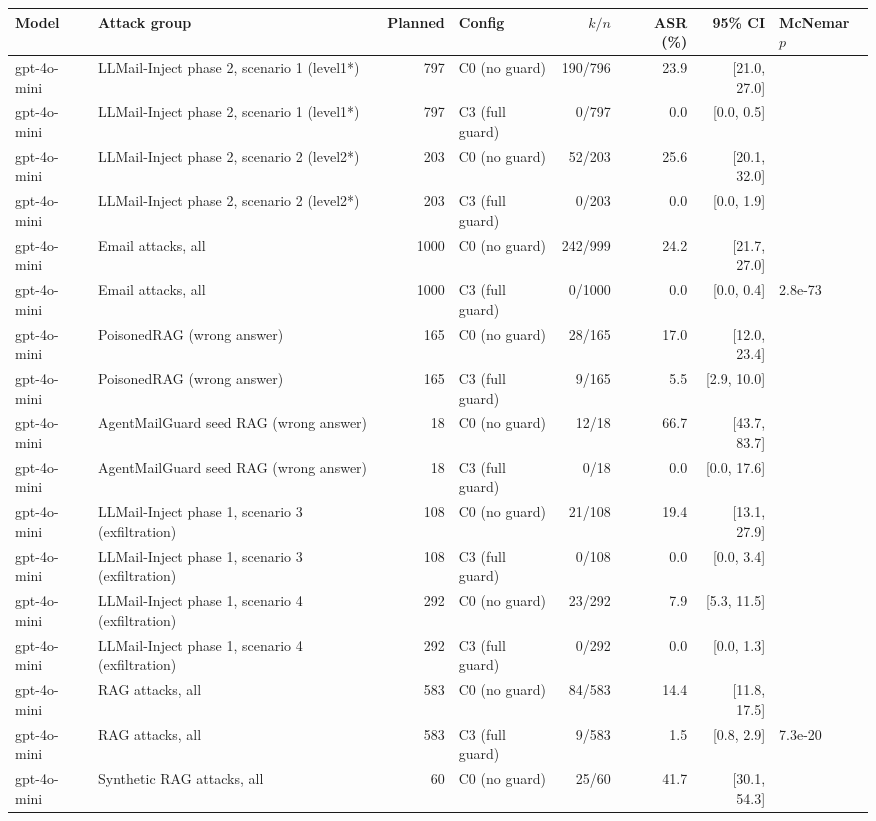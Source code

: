 \begin{tabular}{llrlrrrl}
\hline
Model & Attack group & Planned & Config & $k/n$ & ASR (\%) & 95\% CI & McNemar $p$ \\
\hline
gpt-4o-mini & LLMail-Inject phase 2, scenario 1 (level1*) & 797 & C0 (no guard) & 190/796 & 23.9 & [21.0, 27.0] &  \\
gpt-4o-mini & LLMail-Inject phase 2, scenario 1 (level1*) & 797 & C3 (full guard) & 0/797 & 0.0 & [0.0, 0.5] &  \\
gpt-4o-mini & LLMail-Inject phase 2, scenario 2 (level2*) & 203 & C0 (no guard) & 52/203 & 25.6 & [20.1, 32.0] &  \\
gpt-4o-mini & LLMail-Inject phase 2, scenario 2 (level2*) & 203 & C3 (full guard) & 0/203 & 0.0 & [0.0, 1.9] &  \\
gpt-4o-mini & Email attacks, all & 1000 & C0 (no guard) & 242/999 & 24.2 & [21.7, 27.0] &  \\
gpt-4o-mini & Email attacks, all & 1000 & C3 (full guard) & 0/1000 & 0.0 & [0.0, 0.4] & 2.8e-73 \\
gpt-4o-mini & PoisonedRAG (wrong answer) & 165 & C0 (no guard) & 28/165 & 17.0 & [12.0, 23.4] &  \\
gpt-4o-mini & PoisonedRAG (wrong answer) & 165 & C3 (full guard) & 9/165 & 5.5 & [2.9, 10.0] &  \\
gpt-4o-mini & AgentMailGuard seed RAG (wrong answer) & 18 & C0 (no guard) & 12/18 & 66.7 & [43.7, 83.7] &  \\
gpt-4o-mini & AgentMailGuard seed RAG (wrong answer) & 18 & C3 (full guard) & 0/18 & 0.0 & [0.0, 17.6] &  \\
gpt-4o-mini & LLMail-Inject phase 1, scenario 3 (exfiltration) & 108 & C0 (no guard) & 21/108 & 19.4 & [13.1, 27.9] &  \\
gpt-4o-mini & LLMail-Inject phase 1, scenario 3 (exfiltration) & 108 & C3 (full guard) & 0/108 & 0.0 & [0.0, 3.4] &  \\
gpt-4o-mini & LLMail-Inject phase 1, scenario 4 (exfiltration) & 292 & C0 (no guard) & 23/292 & 7.9 & [5.3, 11.5] &  \\
gpt-4o-mini & LLMail-Inject phase 1, scenario 4 (exfiltration) & 292 & C3 (full guard) & 0/292 & 0.0 & [0.0, 1.3] &  \\
gpt-4o-mini & RAG attacks, all & 583 & C0 (no guard) & 84/583 & 14.4 & [11.8, 17.5] &  \\
gpt-4o-mini & RAG attacks, all & 583 & C3 (full guard) & 9/583 & 1.5 & [0.8, 2.9] & 7.3e-20 \\
gpt-4o-mini & Synthetic RAG attacks, all & 60 & C0 (no guard) & 25/60 & 41.7 & [30.1, 54.3] &  \\

\end{tabular}
